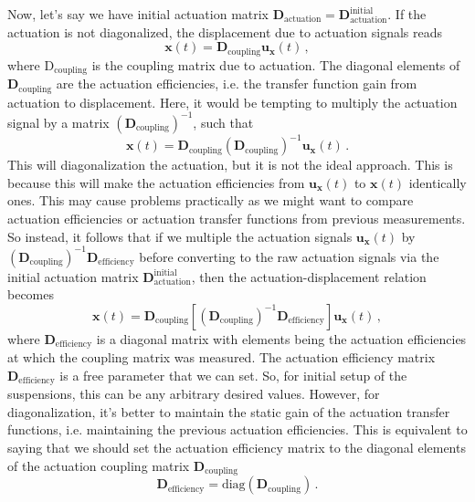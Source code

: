 Now, let's say we have initial actuation matrix $\mathbf{D}_\mathrm{actuation} = \mathbf{D}_\mathrm{actuation}^\mathrm{initial}$.
If the actuation is not diagonalized, the displacement due to actuation signals reads
\begin{equation}
	\mathbf{x}(t) = \mathbf{D}_\mathrm{coupling}\mathbf{u}_\mathbf{x}(t) \,,
	\label{eqn:coupled_displacement_actuation}
\end{equation}
where $\mathrm{D}_\mathrm{coupling}$ is the coupling matrix due to actuation.
The diagonal elements of $\mathbf{D}_\mathrm{coupling}$ are the actuation efficiencies, i.e. the transfer function gain from actuation to displacement.
Here, it would be tempting to multiply the actuation signal by a matrix $\left(\mathbf{D}_\mathrm{coupling}\right)^{-1}$, such that
\begin{equation}
	\mathbf{x}(t)=\mathbf{D}_\mathrm{coupling}\left(\mathbf{D}_\mathrm{coupling}\right)^{-1} \mathbf{u}_\mathbf{x}(t)\,.
\end{equation}
This will diagonalization the actuation, but it is not the ideal approach.
This is because this will make the actuation efficiencies from $\mathbf{u}_\mathbf{x}(t)$ to $\mathbf{x}(t)$ identically ones.
This may cause problems practically as we might want to compare actuation efficiencies or actuation transfer functions from previous measurements.
So instead, it follows that if we multiple the actuation signals $\mathbf{u}_\mathbf{x}(t)$ by $\left(\mathbf{D}_\mathrm{coupling}\right)^{-1}\mathbf{D}_\mathrm{efficiency}$ before converting to the raw actuation signals via the initial actuation matrix  $\mathbf{D}_\mathrm{actuation}^\mathrm{initial}$, then the actuation-displacement relation becomes
\begin{equation}
	\mathbf{x}(t) = \mathbf{D}_\mathrm{coupling}\left[\left(\mathbf{D}_\mathrm{coupling}\right)^{-1}\mathbf{D}_\mathrm{efficiency}\right]\mathbf{u}_\mathbf{x}(t)\,,
	\label{eqn:actuation_displacement_relation_diagonalized}
\end{equation}
where $\mathbf{D}_\mathrm{efficiency}$ is a diagonal matrix with elements being the actuation efficiencies at which the coupling matrix was measured.
The actuation efficiency matrix $\mathbf{D}_\mathrm{efficiency}$ is a free parameter that we can set.
So, for initial setup of the suspensions, this can be any arbitrary desired values.
However, for diagonalization, it's better to maintain the static gain of the actuation transfer functions, i.e. maintaining the previous actuation efficiencies.
This is equivalent to saying that we should set the actuation efficiency matrix to the diagonal elements of the actuation coupling matrix $\mathbf{D}_\mathrm{coupling}$
\begin{equation}
	\mathbf{D}_\mathrm{efficiency} = \text{diag}\left(\mathbf{D}_\mathrm{coupling}\right)\,.
\end{equation}

